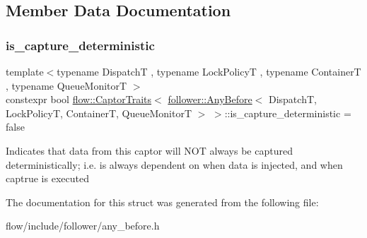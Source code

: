 \subsection{Member Data Documentation}
\mbox{\label{structflow_1_1_captor_traits_3_01follower_1_1_any_before_3_01_dispatch_t_00_01_lock_policy_t_00_55050b2eb17fc5bc754f0ec7f3a869fd_ae94a381cf76ac9f1a639c58570aa6350}} 
\subsubsection{\texorpdfstring{is\+\_\+capture\+\_\+deterministic}{is\_capture\_deterministic}}
{\footnotesize\ttfamily template$<$typename DispatchT , typename Lock\+PolicyT , typename ContainerT , typename Queue\+MonitorT $>$ \\
constexpr bool \hyperlink{structflow_1_1_captor_traits}{flow\+::\+Captor\+Traits}$<$ \hyperlink{classflow_1_1follower_1_1_any_before}{follower\+::\+Any\+Before}$<$ DispatchT, Lock\+PolicyT, ContainerT, Queue\+MonitorT $>$ $>$\+::is\+\_\+capture\+\_\+deterministic = false\hspace{0.3cm}{\ttfamily [static]}}

Indicates that data from this captor will N\+OT always be captured deterministically; i.\+e. is always dependent on when data is injected, and when captrue is executed 

The documentation for this struct was generated from the following file\+:\begin{DoxyCompactItemize}
\item 
flow/include/follower/any\+\_\+before.\+h\end{DoxyCompactItemize}
